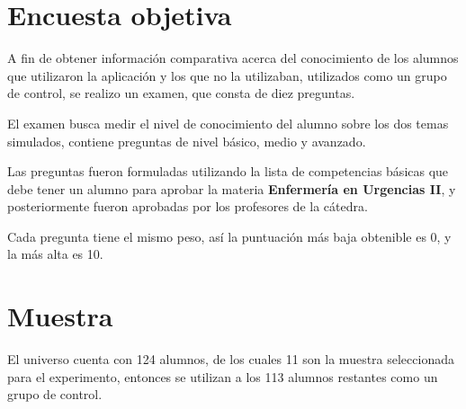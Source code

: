 \section{Encuesta objetiva}
\label{sec:objetiva}

A fin de obtener información comparativa acerca del conocimiento de los alumnos
que utilizaron la aplicación y los que no la utilizaban, utilizados como un
grupo de control, se realizo un examen, que consta de diez preguntas.

El examen busca medir el nivel de conocimiento del alumno sobre los dos temas
simulados, contiene preguntas de nivel básico, medio y avanzado.

Las preguntas fueron formuladas utilizando la lista de competencias básicas que
debe tener un alumno para aprobar la materia \textbf{Enfermería en Urgencias
    II}, y posteriormente fueron aprobadas por los profesores de la cátedra.

Cada pregunta tiene el mismo peso, así la puntuación más baja obtenible es 0, y
la más alta es 10.

\section{Muestra}

El universo cuenta con 124 alumnos, de los cuales 11 son la muestra seleccionada
para el experimento, entonces se utilizan a los 113 alumnos restantes como un 
grupo de control.

